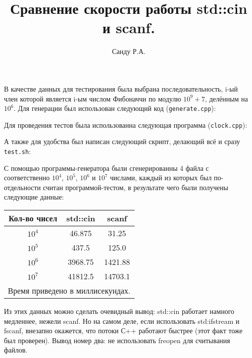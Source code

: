 \documentclass[11pt]{article}
\title{Сравнение скорости работы std::cin и scanf.}
\author{Санду Р.А.}
\date{}
\begin{document}
\maketitle

В качестве данных для тестирования была выбрана последовательность, i-ый член которой является i-ым числом Фибоначчи по модулю $10^9+7$, делённым на $10^6$.
Для генерации был использован следующий код (\verb!generate.cpp!):

\clearpage

Для проведения тестов была использованна следующая программа (\verb!clock.cpp!):



А также для удобства был написан следующий скрипт, делающий всё и сразу \verb!test.sh!:


С помощью программы-генератора были сгенерированны 4 файла с соответственно $10^4$, $10^5$, $10^6$ и $10^7$ числами, каждый из которых был по-отдельности считан программой-тестом, в результате чего были получены следующие данные:

\begin{center}
\begin{tabular}{ | c | c | c | }
	\hline
	Кол-во чисел & std::cin & scanf \\
	\hline
	$10^4$ & 46.875 & 31.25 \\
	$10^5$ & 437.5 & 125.0 \\
	$10^6$ & 3968.75 & 1421.88 \\
	$10^7$ & 41812.5 & 14703.1 \\
	\hline
	\hline
	\multicolumn{3}{|c|}{Время приведено в миллисекундах.} \\
	\hline
\end{tabular}
\end{center}

Из этих данных можно сделать очевидный вывод: std::cin работает намного медленнее, нежели scanf.
Но на самом деле, если использовать std:ifstream и fscanf, внезапно окажется, что потоки С++ работают быстрее (этот факт тоже был проверен).
Вывод номер два: не использовать freopen для считывания файлов.
\end{document}
